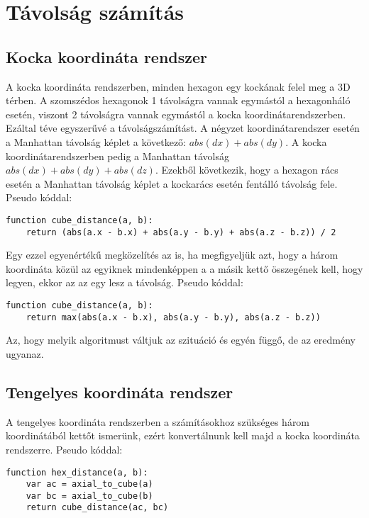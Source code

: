 \chapter{Távolság számítás}

\section{Kocka koordináta rendszer}

A kocka koordináta rendszerben, minden hexagon egy kockának felel meg a 3D térben. A szomszédos hexagonok 1 távolságra vannak egymástól a hexagonháló esetén, viszont 2 távolságra vannak egymástól a kocka koordinátarendszerben. Ezáltal téve egyszerűvé a távolságszámítást. A négyzet koordinátarendszer esetén a Manhattan távolság képlet a következő: $abs(dx) + abs(dy)$. A kocka koordinátarendszerben pedig a Manhattan távolság $abs(dx) + abs(dy) + abs(dz)$. Ezekből következik, hogy a hexagon rács esetén a Manhattan távolság képlet a kockarács esetén fentálló távolság fele.
\newline
\newline Pseudo kóddal:
\begin{verbatim}
function cube_distance(a, b):
    return (abs(a.x - b.x) + abs(a.y - b.y) + abs(a.z - b.z)) / 2
\end{verbatim}    

\noindent Egy ezzel egyenértékű megközelítés az is, ha megfigyeljük azt, hogy a három koordináta közül az egyiknek mindenképpen a a másik kettő összegének kell, hogy legyen, ekkor az az egy lesz a távolság. 
\newline
\newline Pseudo kóddal:
\begin{verbatim}
function cube_distance(a, b):
    return max(abs(a.x - b.x), abs(a.y - b.y), abs(a.z - b.z))
\end{verbatim}

\noindent Az, hogy melyik algoritmust váltjuk az szituáció és egyén függő, de az eredmény ugyanaz.

\section{Tengelyes koordináta rendszer}

A tengelyes koordináta rendszerben a számításokhoz szükséges három koordinátából kettőt ismerünk, ezért konvertálnunk kell majd a kocka koordináta rendszerre.
\newline
\newline Pseudo kóddal:
\begin{verbatim}
function hex_distance(a, b):
    var ac = axial_to_cube(a)
    var bc = axial_to_cube(b)
    return cube_distance(ac, bc)
\end{verbatim}    

